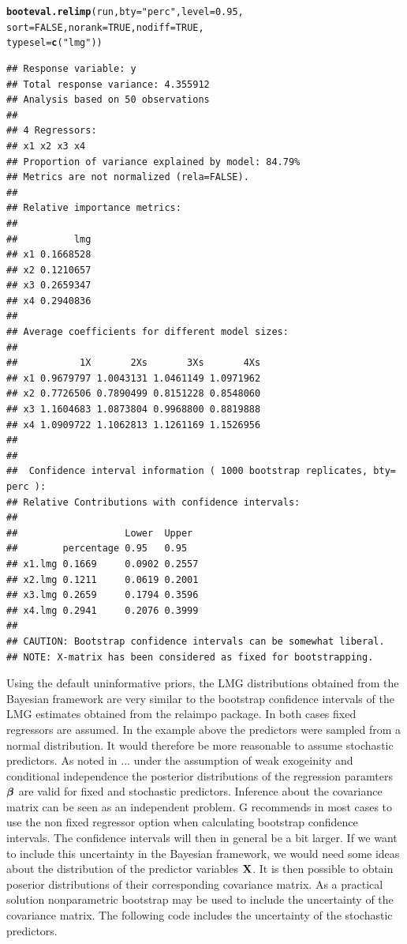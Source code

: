 \documentclass[11pt,a4paper,twoside]{book}\usepackage[]{graphicx}\usepackage[]{color}
\makeatletter
\newcommand{\hlnum}[1]{\textcolor[rgb]{0.686,0.059,0.569}{#1}}%
\newcommand{\hlstr}[1]{\textcolor[rgb]{0.192,0.494,0.8}{#1}}%
\newcommand{\hlstd}[1]{\textcolor[rgb]{0.345,0.345,0.345}{#1}}%
\newcommand{\hlkwc}[1]{\textcolor[rgb]{0.333,0.667,0.333}{#1}}%
\newcommand{\hlkwd}[1]{\textcolor[rgb]{0.737,0.353,0.396}{\textbf{#1}}}%
\newenvironment{kframe}{%
 \def\at@end@of@kframe{}%
 \ifinner\ifhmode%
  \def\at@end@of@kframe{\end{minipage}}%
  \begin{minipage}{\columnwidth}%
 \fi\fi%
 \def\FrameCommand##1{\hskip\@totalleftmargin \hskip-\fboxsep
 \colorbox{shadecolor}{##1}\hskip-\fboxsep
     \hskip-\linewidth \hskip-\@totalleftmargin \hskip\columnwidth}%
 \MakeFramed {\advance\hsize-\width
   \@totalleftmargin\z@ \linewidth\hsize
   \@setminipage}}%
 {\par\unskip\endMakeFramed%
 \at@end@of@kframe}
\newenvironment{knitrout}{}{} %
\makeatother
\begin{document}
\begin{knitrout}
\begin{kframe}
\begin{alltt}
\hlkwd{booteval.relimp}\hlstd{(run,} \hlkwc{bty} \hlstd{=} \hlstr{"perc"}\hlstd{,} \hlkwc{level} \hlstd{=} \hlnum{0.95}\hlstd{,}
                \hlkwc{sort} \hlstd{=} \hlnum{FALSE}\hlstd{,} \hlkwc{norank} \hlstd{=} \hlnum{TRUE}\hlstd{,} \hlkwc{nodiff} \hlstd{=} \hlnum{TRUE}\hlstd{,}
                \hlkwc{typesel} \hlstd{=} \hlkwd{c}\hlstd{(}\hlstr{"lmg"}\hlstd{))}
\end{alltt}
\begin{verbatim}
## Response variable: y 
## Total response variance: 4.355912 
## Analysis based on 50 observations 
## 
## 4 Regressors: 
## x1 x2 x3 x4 
## Proportion of variance explained by model: 84.79%
## Metrics are not normalized (rela=FALSE). 
## 
## Relative importance metrics: 
## 
##          lmg
## x1 0.1668528
## x2 0.1210657
## x3 0.2659347
## x4 0.2940836
## 
## Average coefficients for different model sizes: 
## 
##           1X       2Xs       3Xs       4Xs
## x1 0.9679797 1.0043131 1.0461149 1.0971962
## x2 0.7726506 0.7890499 0.8151228 0.8548060
## x3 1.1604683 1.0873804 0.9968800 0.8819888
## x4 1.0909722 1.1062813 1.1261169 1.1526956
## 
##  
##  Confidence interval information ( 1000 bootstrap replicates, bty= perc ): 
## Relative Contributions with confidence intervals: 
##  
##                   Lower  Upper
##        percentage 0.95   0.95  
## x1.lmg 0.1669     0.0902 0.2557
## x2.lmg 0.1211     0.0619 0.2001
## x3.lmg 0.2659     0.1794 0.3596
## x4.lmg 0.2941     0.2076 0.3999
## 
## CAUTION: Bootstrap confidence intervals can be somewhat liberal. 
## NOTE: X-matrix has been considered as fixed for bootstrapping.
\end{verbatim}
\end{kframe}
\end{knitrout}


Using the default uninformative priors, the LMG distributions obtained from the Bayesian framework are very similar to the bootstrap confidence intervals of the LMG estimates obtained from the relaimpo package. In both cases fixed regressors are assumed. In the example above the predictors were sampled from a normal distribution. It would therefore be more reasonable to assume stochastic predictors. As noted in ... under the assumption of weak exogeinity and conditional independence the posterior distributions of the regression paramters ${\boldsymbol{\beta}}$ are valid for fixed and stochastic predictors. Inference about the covariance matrix can be seen as an independent problem. G recommends in most cases to use the non fixed regressor option when calculating bootstrap confidence intervals. The confidence intervals will then in general be a bit larger. If we want to include this uncertainty in the Bayesian framework, we would need some ideas about the distribution of the predictor variables ${\mathbf{X}}$. It is then possible to obtain poserior distributions of their corresponding covariance matrix. As a practical solution nonparametric bootstrap may be used to include the uncertainty of the covariance matrix. The following code includes the uncertainty of the stochastic predictors. 
\end{document}

